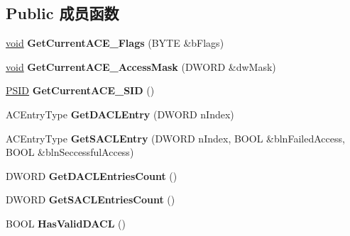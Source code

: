 \subsection*{Public 成员函数}
\begin{DoxyCompactItemize}
\item 
\mbox{\label{class_c_security_descriptor_ab7c3b7f72a97d84b1334adea2c5f9e39}} 
\hyperlink{interfacevoid}{void} {\bfseries Get\+Current\+A\+C\+E\+\_\+\+Flags} (B\+Y\+TE \&b\+Flags)
\item 
\mbox{\label{class_c_security_descriptor_af43c7440ad77f2bcf5c82a7724e86891}} 
\hyperlink{interfacevoid}{void} {\bfseries Get\+Current\+A\+C\+E\+\_\+\+Access\+Mask} (D\+W\+O\+RD \&dw\+Mask)
\item 
\mbox{\label{class_c_security_descriptor_a4b8d8a0ed2d5b5d5b92f8db08cebd9b2}} 
\hyperlink{struct___s_i_d}{P\+S\+ID} {\bfseries Get\+Current\+A\+C\+E\+\_\+\+S\+ID} ()
\item 
\mbox{\label{class_c_security_descriptor_a29136287e24bc07e18216cd77b311c57}} 
A\+C\+Entry\+Type {\bfseries Get\+D\+A\+C\+L\+Entry} (D\+W\+O\+RD n\+Index)
\item 
\mbox{\label{class_c_security_descriptor_ab161d5fac59980263263a2100ab210b5}} 
A\+C\+Entry\+Type {\bfseries Get\+S\+A\+C\+L\+Entry} (D\+W\+O\+RD n\+Index, B\+O\+OL \&bln\+Failed\+Access, B\+O\+OL \&bln\+Seccessful\+Access)
\item 
\mbox{\label{class_c_security_descriptor_acdf7ee94917f0477b4886b37abfbd4e5}} 
D\+W\+O\+RD {\bfseries Get\+D\+A\+C\+L\+Entries\+Count} ()
\item 
\mbox{\label{class_c_security_descriptor_af2e7f30c995bfda91cafa31597a324cc}} 
D\+W\+O\+RD {\bfseries Get\+S\+A\+C\+L\+Entries\+Count} ()
\item 
\mbox{\label{class_c_security_descriptor_a1ee02cc67e75f81c42fca7f62d06c364}} 
B\+O\+OL {\bfseries Has\+Valid\+D\+A\+CL} ()
\item 
\mbox{\label{class_c_security_descriptor_ac94b4b9f26225b911011f559433e6ead}} 

\end{DoxyCompactItemize}
